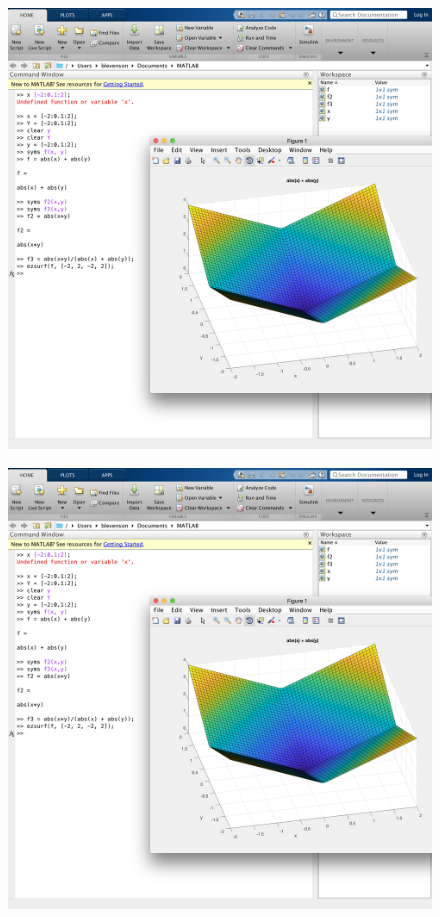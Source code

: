 \documentclass[11pt]{article}
\begin{document}
\begin{figure}[H]
	\centering
	\includegraphics[width=\textwidth]{PartOne_1}
\end{figure}

\begin{figure}[H]
	\centering
	\includegraphics[width=\textwidth]{PartOne_1}
\end{figure}
\end{document}
